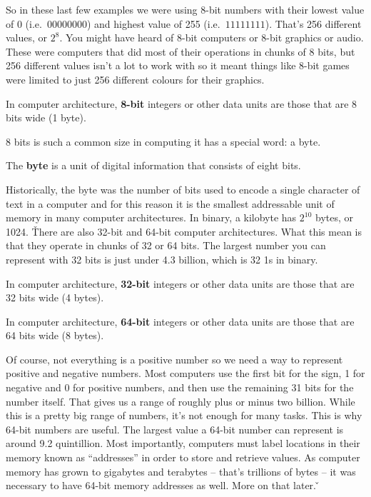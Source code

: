 So in these last few examples we were using 8-bit numbers with their lowest value of 0 (i.e.\ $00000000$) and highest
value of 255 (i.e.\ $11111111$). That's 256 different values, or $2^8$. You might have heard of 8-bit computers or
8-bit graphics or audio. These were computers that did most of their operations in chunks of 8 bits, but 256
different values isn't a lot to work with so it meant things like 8-bit games were limited to just 256 different
colours for their graphics.

\bd[8-bit]
In computer architecture, \textbf{8-bit} integers or other data units are those that are 8 bits wide (1 byte).
\ed

8 bits is such a common size in computing it has a special word: a byte.

\bd[Byte]
The \textbf{byte} is a unit of digital information that consists of eight bits.
\ed

Historically, the byte was the number of bits used to encode a single character of text in a computer and for this
reason it is the smallest addressable unit of memory in many computer architectures. In binary, a kilobyte has
$2^{10}$ bytes, or 1024. \v

There are also 32-bit and 64-bit computer architectures. What this mean is that they operate in chunks of 32 or 64
bits. The largest number you can represent with 32 bits is just under 4.3 billion, which is 32 1s in binary.

\bd[32-bit]
In computer architecture, \textbf{32-bit} integers or other data units are those that are 32 bits wide (4 bytes).
\ed

\bd[64-bit]
In computer architecture, \textbf{64-bit} integers or other data units are those that are 64 bits wide (8 bytes).
\ed

Of course, not everything is a positive number so we need a way to represent positive and negative numbers. Most
computers use the first bit for the sign, 1 for negative and 0 for positive numbers, and then use the remaining 31
bits for the number itself. That gives us a range of roughly plus or minus two billion. While this is a pretty big
range of numbers, it's not enough for many tasks. This is why 64-bit numbers are useful. The largest value a 64-bit
number can represent is around 9.2 quintillion. Most importantly, computers must label locations in their memory
known as ``addresses'' in order to store and retrieve values. As computer memory has grown to gigabytes and terabytes
– that's trillions of bytes – it was necessary to have 64-bit memory addresses as well. More on that later. \v

